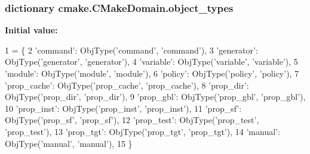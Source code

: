 \subsubsection[{\texorpdfstring{object\+\_\+types}{object_types}}]{\setlength{\rightskip}{0pt plus 5cm}dictionary cmake.\+C\+Make\+Domain.\+object\+\_\+types\hspace{0.3cm}{\ttfamily [static]}}\hypertarget{classcmake_1_1CMakeDomain_aed7e1d6464c1ee93cb9ec7deb5a44f52}{}\label{classcmake_1_1CMakeDomain_aed7e1d6464c1ee93cb9ec7deb5a44f52}
{\bfseries Initial value\+:}
\begin{DoxyCode}
1 = \{
2         \textcolor{stringliteral}{'command'}:    ObjType(\textcolor{stringliteral}{'command'},    \textcolor{stringliteral}{'command'}),
3         \textcolor{stringliteral}{'generator'}:  ObjType(\textcolor{stringliteral}{'generator'},  \textcolor{stringliteral}{'generator'}),
4         \textcolor{stringliteral}{'variable'}:   ObjType(\textcolor{stringliteral}{'variable'},   \textcolor{stringliteral}{'variable'}),
5         \textcolor{stringliteral}{'module'}:     ObjType(\textcolor{stringliteral}{'module'},     \textcolor{stringliteral}{'module'}),
6         \textcolor{stringliteral}{'policy'}:     ObjType(\textcolor{stringliteral}{'policy'},     \textcolor{stringliteral}{'policy'}),
7         \textcolor{stringliteral}{'prop\_cache'}: ObjType(\textcolor{stringliteral}{'prop\_cache'}, \textcolor{stringliteral}{'prop\_cache'}),
8         \textcolor{stringliteral}{'prop\_dir'}:   ObjType(\textcolor{stringliteral}{'prop\_dir'},   \textcolor{stringliteral}{'prop\_dir'}),
9         \textcolor{stringliteral}{'prop\_gbl'}:   ObjType(\textcolor{stringliteral}{'prop\_gbl'},   \textcolor{stringliteral}{'prop\_gbl'}),
10         \textcolor{stringliteral}{'prop\_inst'}:  ObjType(\textcolor{stringliteral}{'prop\_inst'},  \textcolor{stringliteral}{'prop\_inst'}),
11         \textcolor{stringliteral}{'prop\_sf'}:    ObjType(\textcolor{stringliteral}{'prop\_sf'},    \textcolor{stringliteral}{'prop\_sf'}),
12         \textcolor{stringliteral}{'prop\_test'}:  ObjType(\textcolor{stringliteral}{'prop\_test'},  \textcolor{stringliteral}{'prop\_test'}),
13         \textcolor{stringliteral}{'prop\_tgt'}:   ObjType(\textcolor{stringliteral}{'prop\_tgt'},   \textcolor{stringliteral}{'prop\_tgt'}),
14         \textcolor{stringliteral}{'manual'}:     ObjType(\textcolor{stringliteral}{'manual'},     \textcolor{stringliteral}{'manual'}),
15     \}
\end{DoxyCode}
